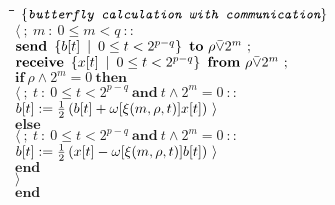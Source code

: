 \begin{tabbing}
	\quad\=\quad\=\quad\=\quad\=\kill
		\>$\color{MidnightBlue}\curlb{\textit{\ttfamily butterfly calculation with communication}}$\\
		\>$\langle \ ;\ m\ :\ 0\leq m<q\ ::$\\
			\>\>$\mathbf{send}\ \set{b[t]}{0\leq t<2^{p-q}}\ \mathbf{to}\ \rho\bar{\vee}2^m\ ;$\\
			\>\>$\mathbf{receive}\ \set{x[t]}{0\leq t<2^{p-q}}\ \mathbf{from}\ \rho\bar{\vee}2^m\ ;$\\
			\>\>$\mathbf{if}\ \rho\wedge 2^m=0\ \mathbf{then}$\\
				\>\>\>$\langle \ ;\ t\ :\ 0\leq t<2^{p-q}\ \mathbf{and}\ t\wedge 2^m=0\ ::$\\
					\>\>\>\>$b[t]:=\frac{1}{2}\curvb{b[t] + \omega[\xi(m,\rho, t)]x[t]}\ \rangle$\\
			\>\>$\mathbf{else}$\\
				\>\>\>$\langle \ ;\ t\ :\ 0\leq t<2^{p-q}\ \mathbf{and}\ t\wedge 2^m=0\ ::$\\
					\>\>\>\>$b[t]:=\frac{1}{2}\curvb{x[t] - \omega[\xi(m,\rho, t)]b[t]}\ \rangle$\\
			\>\>$\mathbf{end}$\\
		\>$\rangle$\\
	$\mathbf{end}$\\
\end{tabbing}